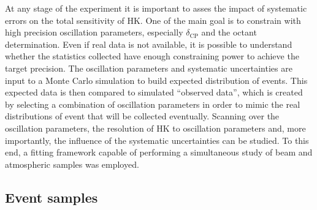 At any stage of the experiment it is important to asses the impact of systematic errors on the total sensitivity of HK.
One of the main goal is to constrain with high precision oscillation parameters, especially $\delta_\text{CP}$ %
and the octant determination.
Even if real data is not available, it is possible to understand whether the statistics collected have %
enough constraining power to achieve the target precision.
The oscillation parameters and systematic uncertainties are input to a Monte Carlo simulation %
to build expected distribution of events.
This expected data is then compared to simulated ``observed data'', which is created by selecting %
a combination of oscillation parameters in order to mimic the real distributions of event that will be collected eventually.
Scanning over the oscillation parameters, the resolution of HK to oscillation parameters and, more importantly, %
the influence of the systematic uncertainties can be studied.
To this end, a fitting framework capable of performing a simultaneous study of beam and atmospheric samples was employed. 

\subsection{Event samples}
\label{sec:event_samples}

